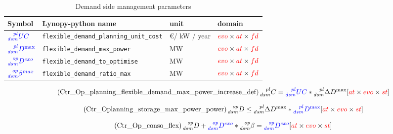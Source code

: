 \documentclass{article}
\begin{document}
\begin{table}[h]
\footnotesize
\centering

\caption{Demand side management parameters}
\begin{tabular}{llll}
\hline
    \textbf{Symbol} & \textbf{Lynopy-python name} & \textbf{unit}  & \textbf{domain} \\ \hline
    
    $\textcolor{blue}{\prescript{pl}{dsm}{UC}}$&  \verb|flexible_demand_planning_unit_cost| & \euro / kW / year & $\textcolor{red}{evo}  \times \textcolor{red}{at} \times \textcolor{red}{fd} $ \\ 
    
    $\textcolor{blue}{\prescript{pl}{dsm}{D}^{\max}}$&  \verb|flexible_demand_max_power| & MW & $\textcolor{red}{evo}  \times \textcolor{red}{at} \times \textcolor{red}{fd} $ \\ 

    $\textcolor{blue}{\prescript{op}{dsm}{D^{exo}}}$&  \verb|flexible_demand_to_optimise| & MW & $\textcolor{red}{evo}  \times \textcolor{red}{at} \times \textcolor{red}{fd} $ \\ 
    
    $\textcolor{blue}{\prescript{op}{dsm}{\beta^{max}}}$&  \verb|flexible_demand_ratio_max| & MW & $\textcolor{red}{evo}  \times \textcolor{red}{at} \times \textcolor{red}{fd} $ \\ 
  \end{tabular}
\end{table}

\begin{equation} \tag{Ctr\_Op\_planning\_flexible\_demand\_max\_power\_increase\_def}
 \prescript{pl}{dsm}{C} = \textcolor{blue}{\prescript{pl}{dsm}{UC}}   * \prescript{pl}{dsm}{\Delta D^{\max}} \hfill [\textcolor{red}{at} \times \textcolor{red}{evo} \times \textcolor{red}{st}]
\label{eq:Ctr_Op_planning_flexible_demand_max_power_increase_def}
\end{equation}

\begin{equation} \tag{Ctr\_Oplanning\_storage\_max\_power\_power}
 \prescript{op}{dsm}{D} \leq  \prescript{pl}{dsm}{\Delta D^{\max}} *\textcolor{blue}{\prescript{pl}{dsm}{D}^{\max}} \hfill [\textcolor{red}{at} \times \textcolor{red}{evo} \times \textcolor{red}{st}]
\label{eq:Ctr_Oplanning_storage_max_power_power}
\end{equation}


\begin{equation} \tag{Ctr\_Op\_conso\_flex}
 \prescript{op}{dsm}{D} + \textcolor{blue}{\prescript{op}{dsm}{D^{exo}}} * \prescript{op}{dsm}{\beta} = \textcolor{blue}{\prescript{op}{dsm}{D^{exo}}} \hfill [\textcolor{red}{at} \times \textcolor{red}{evo} \times \textcolor{red}{st}]
\label{eq:Ctr_Op_conso_flex}
\end{equation}
\end{document}
